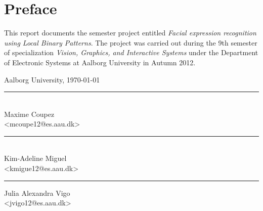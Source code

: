 \hypersetup{bookmarksdepth=-2}
\chapter*{Preface}
\hypersetup{bookmarksdepth}%

This report documents the semester project entitled \textit{Facial expression recognition using Local Binary Patterns}. The project was carried out during the 9th semester of specialization \textit{Vision, Graphics, and Interactive Systems} under the Department of Electronic Systems at Aalborg University in Autumn 2012. 



\vspace{\baselineskip}\hfill Aalborg University, \today
\vfill\noindent
\begin{minipage}[b]{0.45\textwidth}
 \centering
 \rule{\textwidth}{0.5pt}\\
  Maxime Coupez\\
 {\footnotesize <mcoupe12@es.aau.dk>}
\end{minipage}
\hfill
\begin{minipage}[b]{0.45\textwidth}
 \centering
 \rule{\textwidth}{0.5pt}\\
  Kim-Adeline Miguel\\
 {\footnotesize <kmigue12@es.aau.dk>}
\end{minipage}
\vspace{3\baselineskip}
\begin{center}
\begin{minipage}[b]{0.45\textwidth}
 \centering
 \rule{\textwidth}{0.5pt}
  Julia Alexandra Vigo\\
 {\footnotesize <jvigo12@es.aau.dk>}
\end{minipage}
\end{center}
